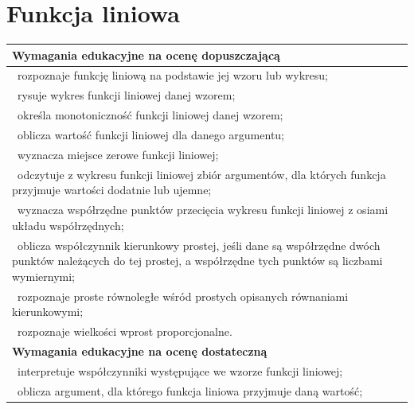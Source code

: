 \documentclass[12pt,a4paper]{article}
\begin{document}
	\section{Funkcja liniowa}
	
	\begin{longtable}{|p{16cm}|}
		\hline
		
		\textbf{Wymagania edukacyjne na ocenę dopuszczającą} \\ \hline
		
		\textbullet\ rozpoznaje funkcję liniową na podstawie jej wzoru lub wykresu; \\
		
		\textbullet\ rysuje wykres funkcji liniowej danej wzorem; \\
		
		\textbullet\ określa monotoniczność funkcji liniowej danej wzorem; \\
		
		\textbullet\ oblicza wartość funkcji liniowej dla danego argumentu; \\
		
		\textbullet\ wyznacza miejsce zerowe funkcji liniowej; \\
		
		\textbullet\ odczytuje z wykresu funkcji liniowej zbiór argumentów, dla których funkcja przyjmuje wartości dodatnie lub ujemne; \\
		
		\textbullet\ wyznacza współrzędne punktów przecięcia wykresu funkcji liniowej z osiami układu współrzędnych; \\
		
		\textbullet\ oblicza współczynnik kierunkowy prostej, jeśli dane są współrzędne dwóch punktów należących do tej prostej, a współrzędne tych punktów są liczbami wymiernymi; \\
		
		\textbullet\ rozpoznaje proste równoległe wśród prostych opisanych równaniami kierunkowymi; \\
		
		\textbullet\ rozpoznaje wielkości wprost proporcjonalne. \\ \hline
		
		\textbf{Wymagania edukacyjne na ocenę dostateczną} \\ \hline
		
		\textbullet\ interpretuje współczynniki występujące we wzorze funkcji liniowej; \\
		
		\textbullet\ oblicza argument, dla którego funkcja liniowa przyjmuje daną wartość; \\
		

\end{longtable}
\end{document}
